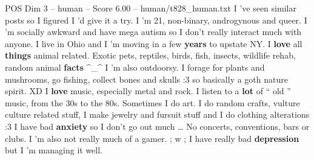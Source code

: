 \begin{textsample}{POS Dim 3 – human – Score 6.00 – human/t828\_human.txt}  \label{ex:f3_pos_005}
I ’ve seen similar posts so I figured I ’d give it a try.
I ’m 21, non-binary, androgynous and queer.
I ’m socially awkward and have mega autism so I don't really interact much with anyone.
I live in Ohio and I ’m moving in a few \textbf{years} to upstate NY.
I \textbf{love} all \textbf{things} animal related.
Exotic pets, reptiles, birds, fish, insects, wildlife rehab, random animal \textbf{facts} ^_^ I ’m also outdoorsy.
I forage for plants and mushrooms, go fishing, collect bones and skulls :3 so basically a goth nature spirit.
XD I \textbf{love} music, especially metal and rock.
I listen to a \textbf{lot} of “ old ” music, from the 30s to the 80s.
Sometimes I do art.
I do random crafts, vulture culture related stuff, I make jewelry and fursuit stuff and I do clothing alterations :3 I have bad \textbf{anxiety} so I don't go out much … No concerts, conventions, bars or clubs.
I ’m also not really much of a gamer. ; w ; I have really bad \textbf{depression} but I ’m managing it well.

\end{textsample}
